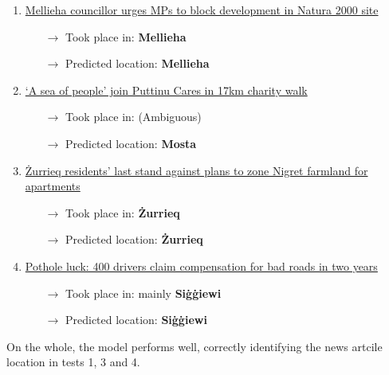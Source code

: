 \documentclass[a4paper, oneside, 11pt]{article}
\begin{document}
\begin{multicols*}{2}
  \begin{enumerate}
    \item \href{https://newsbook.com.mt/en/mellieha-councillor-urges-mps-to-block-development-in-natura-2000-site/}{Mellieha councillor urges MPs to block development in Natura 2000 site}
          \begin{itemize}
            \item[$\rightarrow$] Took place in: \textbf{Mellieha}
            \item[$\rightarrow$] Predicted location: \textbf{Mellieha}
          \end{itemize}
          \item\href{https://newsbook.com.mt/en/a-sea-of-people-join-puttinu-cares-in-17km-charity-walk/}{`A sea of people' join Puttinu Cares in 17km charity walk}
          \begin{itemize}
            \item[$\rightarrow$] Took place in: (Ambiguous)
            \item[$\rightarrow$] Predicted location: \textbf{Mosta}
          \end{itemize}
          \item\href{https://newsbook.com.mt/en/zurrieq-residents-last-stand-against-plans-to-zone-nigret-farmland-for-apartments/}{Żurrieq residents’ last stand against plans to zone Nigret farmland for apartments}
          \begin{itemize}
            \item[$\rightarrow$] Took place in: \textbf{Żurrieq}
            \item[$\rightarrow$] Predicted location: \textbf{Żurrieq}
          \end{itemize}

          \item\href{https://timesofmalta.com/articles/view/pothole-luck-400-drivers-claim-compensation-bad-roads-two-years.1032416}{Pothole luck: 400 drivers claim compensation for bad roads in two years}
          \begin{itemize}
            \item[$\rightarrow$] Took place in: mainly \textbf{Siġġiewi}
            \item[$\rightarrow$] Predicted location: \textbf{Siġġiewi}
          \end{itemize}
  \end{enumerate}

  On the whole, the model performs well, correctly identifying the news artcile location in tests 1, 3 and 4.


\end{multicols*}
\end{document}
